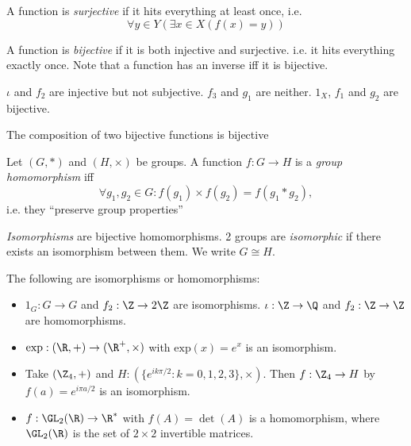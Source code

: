 \documentclass[a4pape]{article}
\begin{document}
\begin{defi}
  A function is \emph{surjective} if it hits everything at least once, i.e. 
  \[
  \forall y\in Y(\exists x\in X(f(x) = y))
  \]
\end{defi}

\begin{defi}
  A function is \emph{bijective} if it is both injective and surjective. i.e. it hits everything exactly once. Note that a function has an inverse iff it is bijective.
\end{defi}

\begin{eg}
  $\iota$ and $f_2$ are injective but not subjective. $f_3$ and $g_1$ are neither. $1_X$, $f_1$ and $g_2$ are bijective.
\end{eg}

\begin{lemma}
  The composition of two bijective functions is bijective
\end{lemma}

\begin{defi}
  Let $(G, *)$ and $(H, \times)$ be groups. A function $f:G\rightarrow H$ is a \emph{group homomorphism} iff
  \[
  \forall g_1, g_2 \in G: f(g_1)\times f(g_2) = f(g_1 * g_2),
  \]
  i.e. they ``preserve group properties''
\end{defi}

\begin{defi}
  \emph{Isomorphisms} are bijective homomorphisms. 2 groups are \emph{isomorphic} if there exists an isomorphism between them. We write $G\cong H$.
\end{defi}

\begin{eg}
  The following are isomorphisms or homomorphisms:
  \begin{itemize}
  \item $1_G: G \rightarrow G$ and $f_2: \Z \rightarrow 2\Z$  are isomorphisms. $\iota: \Z\rightarrow\Q$ and $f_2:\Z\rightarrow\Z$ are homomorphisms.
  \item $\mathrm{exp}: (\R, +) \rightarrow (\R^+, \times)$ with $\mathrm{exp}(x) = e^x$ is an isomorphism.
  \item Take $(\Z_4, +)$ and $H: (\{e^{ik\pi/2}:k=0, 1 ,2, 3\}, \times)$. Then $f: \Z_4 \rightarrow H$  by $f(a) = e^{i\pi a/2}$ is an isomorphism.
  \item $f: \GL_2(\R) \rightarrow \R^*$ with $f(A) = \det(A)$ is a homomorphism, where $\GL_2(\R)$ is the set of $2\times 2$ invertible matrices.
  \end{itemize}
\end{eg}
\end{document}
